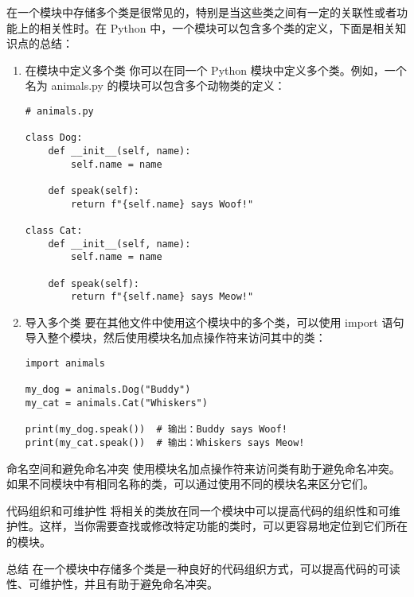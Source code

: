 \documentclass{article}
\begin{document}
在一个模块中存储多个类是很常见的，特别是当这些类之间有一定的关联性或者功能上的相关性时。在 Python 中，一个模块可以包含多个类的定义，下面是相关知识点的总结：
\begin{enumerate}
\item 在模块中定义多个类
你可以在同一个 Python 模块中定义多个类。例如，一个名为 animals.py 的模块可以包含多个动物类的定义：
\begin{lstlisting}[caption={示例Python代码}]
# animals.py

class Dog:
    def __init__(self, name):
        self.name = name

    def speak(self):
        return f"{self.name} says Woof!"

class Cat:
    def __init__(self, name):
        self.name = name

    def speak(self):
        return f"{self.name} says Meow!"
\end{lstlisting}       
\item 导入多个类
要在其他文件中使用这个模块中的多个类，可以使用 import 语句导入整个模块，然后使用模块名加点操作符来访问其中的类：
\begin{lstlisting}[caption={示例Python代码}]
import animals

my_dog = animals.Dog("Buddy")
my_cat = animals.Cat("Whiskers")

print(my_dog.speak())  # 输出：Buddy says Woof!
print(my_cat.speak())  # 输出：Whiskers says Meow!
\end{lstlisting}
\end{enumerate}
命名空间和避免命名冲突
使用模块名加点操作符来访问类有助于避免命名冲突。如果不同模块中有相同名称的类，可以通过使用不同的模块名来区分它们。

代码组织和可维护性
将相关的类放在同一个模块中可以提高代码的组织性和可维护性。这样，当你需要查找或修改特定功能的类时，可以更容易地定位到它们所在的模块。

总结
在一个模块中存储多个类是一种良好的代码组织方式，可以提高代码的可读性、可维护性，并且有助于避免命名冲突。
\end{document}
